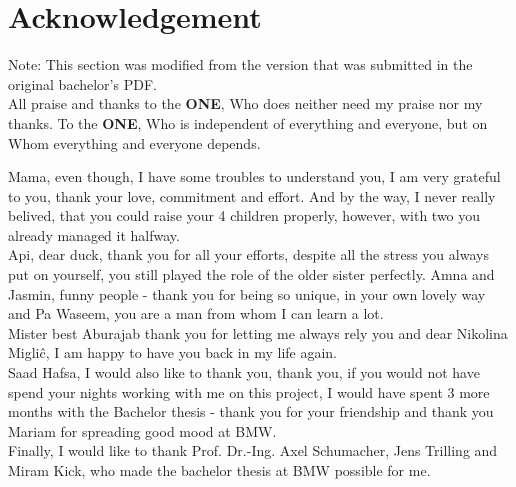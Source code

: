 \chapter*{Acknowledgement}

Note: This section was modified from the version that was submitted in the original bachelor's PDF.\\

All praise and thanks to the \textbf{ONE}, Who does neither need my praise nor my thanks. 
To the \textbf{ONE}, Who is independent of everything and everyone, but on Whom everything and everyone depends.

\vspace{1cm}
Mama, even though, I have some troubles to understand you, I am very grateful to you, thank
your love, commitment and effort. And by the way, I never really belived, that you could raise
your 4 children properly, however, with two you already managed it halfway.\\

Api, dear duck, thank you for all your efforts, despite all the stress you always put on yourself, you still played the role of the older sister perfectly. Amna and Jasmin, funny people - thank you for being so unique, in your own lovely way and Pa Waseem, you are a man from whom I can learn a lot. \\


Mister best Aburajab  thank you for letting me always rely you and dear Nikolina Migli\^{c},
I am happy to have you back in my life again. \\

Saad Hafsa, I would also like to thank you, thank you, if you would not have spend
your nights working
with me on this project, I would have spent 3 more months with the Bachelor thesis - thank you for your friendship and thank you Mariam for spreading good mood at BMW.\\

Finally, I would like to
thank Prof. Dr.-Ing. Axel Schumacher,  Jens Trilling and  Miram Kick, who
made the bachelor thesis at BMW possible for me. 

